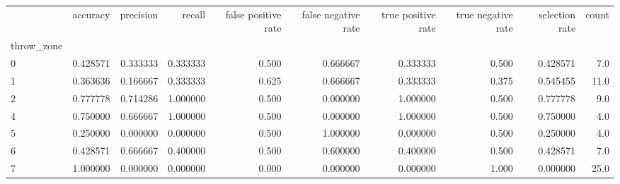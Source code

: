 \begin{tabular}{lrrrrrrrrr}
\toprule
{} &  accuracy &  precision &    recall &  false positive rate &  false negative rate &  true positive rate &  true negative rate &  selection rate &  count \\
throw\_zone &           &            &           &                      &                      &                     &                     &                 &        \\
\midrule
0          &  0.428571 &   0.333333 &  0.333333 &                0.500 &             0.666667 &            0.333333 &               0.500 &        0.428571 &    7.0 \\
1          &  0.363636 &   0.166667 &  0.333333 &                0.625 &             0.666667 &            0.333333 &               0.375 &        0.545455 &   11.0 \\
2          &  0.777778 &   0.714286 &  1.000000 &                0.500 &             0.000000 &            1.000000 &               0.500 &        0.777778 &    9.0 \\
4          &  0.750000 &   0.666667 &  1.000000 &                0.500 &             0.000000 &            1.000000 &               0.500 &        0.750000 &    4.0 \\
5          &  0.250000 &   0.000000 &  0.000000 &                0.500 &             1.000000 &            0.000000 &               0.500 &        0.250000 &    4.0 \\
6          &  0.428571 &   0.666667 &  0.400000 &                0.500 &             0.600000 &            0.400000 &               0.500 &        0.428571 &    7.0 \\
7          &  1.000000 &   0.000000 &  0.000000 &                0.000 &             0.000000 &            0.000000 &               1.000 &        0.000000 &   25.0 \\
\bottomrule
\end{tabular}
